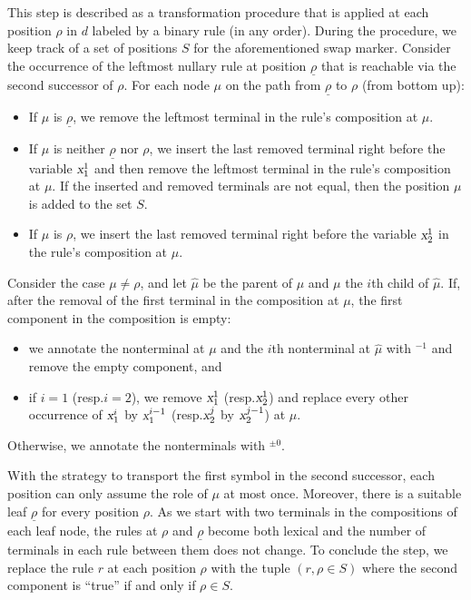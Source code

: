 \documentclass[../../document.tex]{subfiles}
\begin{document}
    This step is described as a transformation procedure that is applied at each position \(\rho\) in \(d\) labeled by a binary rule (in any order).
    During the procedure, we keep track of a set of positions \(S\) for the aforementioned swap marker.
    Consider the occurrence of the leftmost nullary rule at position \(\underline{\rho}\) that is reachable via the second successor of \(\rho\).
    For each node \(\mu\) on the path from \(\underline{\rho}\) to \(\rho\) (from bottom up):
    \begin{itemize}
        \item If \(\mu\) is \(\underline{\rho}\), we remove the leftmost terminal in the rule's composition at \(\mu\).
        \item
            If \(\mu\) is neither \(\underline{\rho}\) nor \(\rho\), we insert the last removed terminal right before the variable \(\textsl{x}^1_1\) and then remove the leftmost terminal in the rule's composition at \(\mu\).
            If the inserted and removed terminals are not equal, then the position \(\mu\) is added to the set \(S\).
        \item If \(\mu\) is \(\rho\), we insert the last removed terminal right before the variable \(\textsl{x}^1_2\) in the rule's composition at \(\mu\).
    \end{itemize}
    Consider the case \(\mu \neq \rho\), and let \(\hat{\mu}\) be the parent of $\mu$ and $\mu$ the \(i\)th child of $\hat{\mu}$.
    If, after the removal of the first terminal in the composition at \(\mu\), the first component in the composition is empty:
    \begin{itemize}
        \item we annotate the  nonterminal at \(\mu\) and the \(i\)th  nonterminal at \(\hat{\mu}\) with $^{-1}$ and remove the empty component, and
        \item if \(i = 1\) (resp.\@ \(i = 2\)), we remove \(\textsl{x}^1_1\) (resp.\@ \(\textsl{x}_2^1\)) and replace every other occurrence of \(\textsl{x}_1^i\) by \(\textsl{x}_1^{i-1}\) (resp.\@ \(\textsl{x}_2^j\) by \(\textsl{x}_2^{j-1}\)) at $\hat{\mu}$.
    \end{itemize}
    Otherwise, we annotate the nonterminals with \(^{\pm 0}\).

    With the strategy to transport the first symbol in the second successor, each position can only assume the role of \(\mu\) at most once.
    Moreover, there is a suitable leaf $\underline{\rho}$ for every position $\rho$.
    As we start with two terminals in the compositions of each leaf node, the rules at \(\rho\) and \(\underline{\rho}\) become both lexical and the number of terminals in each rule between them does not change.
    To conclude the step, we replace the rule \(r\) at each position \(\rho\) with the tuple \((r, \rho \in S)\) where the second component is ``true'' if and only if \(\rho \in S\).
\end{document}
